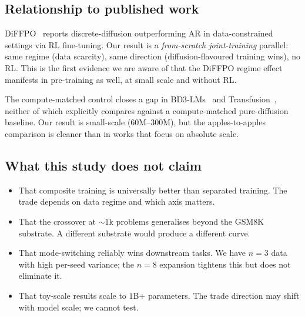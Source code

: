 \subsection{Relationship to published work}

DiFFPO~\citep{wei2025diffpo} reports discrete-diffusion outperforming
AR in data-constrained settings via RL fine-tuning. Our result is a
\emph{from-scratch joint-training} parallel: same regime (data
scarcity), same direction (diffusion-flavoured training wins), no RL.
This is the first evidence we are aware of that the DiFFPO regime
effect manifests in pre-training as well, at small scale and without
RL.

The compute-matched control closes a gap in
BD3-LMs~\citep{nie2025bd3} and Transfusion~\citep{zhou2024transfusion},
neither of which explicitly compares against a compute-matched
pure-diffusion baseline. Our result is small-scale (60M--300M), but
the apples-to-apples comparison is cleaner than in works that focus
on absolute scale.

\subsection{What this study does not claim}

\begin{itemize}
  \item That composite training is universally better than separated
        training. The trade depends on data regime and which axis
        matters.
  \item That the crossover at $\sim 1$k problems generalises beyond
        the GSM8K substrate. A different substrate would produce a
        different curve.
  \item That mode-switching reliably wins downstream tasks. We have
        $n=3$ data with high per-seed variance; the $n=8$ expansion
        tightens this but does not eliminate it.
  \item That toy-scale results scale to $1$B+ parameters. The trade
        direction may shift with model scale; we cannot test.
\end{itemize}
